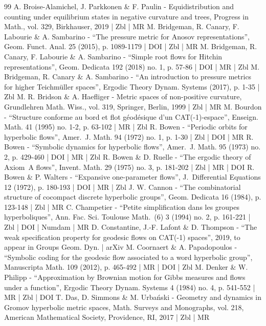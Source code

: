 \begin{thebibliography}{99}
A. Broise-Alamichel, J. Parkkonen \& F. Paulin - Equidistribution and counting under equilibrium states in negative curvature and trees, Progress in Math., vol. 329, Birkhauser, 2019 | Zbl | MR
M. Bridgeman, R. Canary, F. Labourie \& A. Sambarino - “The pressure metric for Anosov representations”, Geom. Funct. Anal. 25 (2015), p. 1089-1179 | DOI | Zbl | MR
M. Bridgeman, R. Canary, F. Labourie \& A. Sambarino - “Simple root flows for Hitchin representations”, Geom. Dedicata 192 (2018) no. 1, p. 57-86 | DOI | MR | Zbl
M. Bridgeman, R. Canary \& A. Sambarino - “An introduction to pressure metrics for higher Teichmüller spaces”, Ergodic Theory Dynam. Systems (2017), p. 1-35 | Zbl
M. R. Bridson \& A. Haefliger - Metric spaces of non-positive curvature, Grundlehren Math. Wiss., vol. 319, Springer, Berlin, 1999 | Zbl | MR
M. Bourdon - “Structure conforme au bord et flot géodésique d’un CAT(-1)-espace”, Enseign. Math. 41 (1995) no. 1-2, p. 63-102 | MR | Zbl
R. Bowen - “Periodic orbits for hyperbolic flows”, Amer. J. Math. 94 (1972) no. 1, p. 1-30 | Zbl | DOI | MR
R. Bowen - “Symbolic dynamics for hyperbolic flows”, Amer. J. Math. 95 (1973) no. 2, p. 429-460 | DOI | MR | Zbl
R. Bowen \& D. Ruelle - “The ergodic theory of Axiom A flows”, Invent. Math. 29 (1975) no. 3, p. 181-202 | Zbl | MR | DOI
R. Bowen \& P. Walters - “Expansive one-parameter flows”, J. Differential Equations 12 (1972), p. 180-193 | DOI | MR | Zbl
J. W. Cannon - “The combinatorial structure of cocompact discrete hyperbolic groups”, Geom. Dedicata 16 (1984), p. 123-148 | Zbl | MR
C. Champetier - “Petite simplification dans les groupes hyperboliques”, Ann. Fac. Sci. Toulouse Math. (6) 3 (1994) no. 2, p. 161-221 | Zbl | DOI | Numdam | MR
D. Constantine, J.-F. Lafont \& D. Thompson - “The weak specification property for geodesic flows on CAT(-1) spaces”, 2019, to appear in Groups Geom. Dyn. | arXiv
M. Coornaert \& A. Papadopoulos - “Symbolic coding for the geodesic flow associated to a word hyperbolic group”, Manuscripta Math. 109 (2012), p. 465-492 | MR | DOI | Zbl
M. Denker \& W. Philipp - “Approximation by Brownian motion for Gibbs measures and flows under a function”, Ergodic Theory Dynam. Systems 4 (1984) no. 4, p. 541-552 | MR | Zbl | DOI
T. Das, D. Simmons \& M. Urbański - Geometry and dynamics in Gromov hyperbolic metric spaces, Math. Surveys and Monographs, vol. 218, American Mathematical Society, Providence, RI, 2017 | Zbl | MR

\end{thebibliography}
